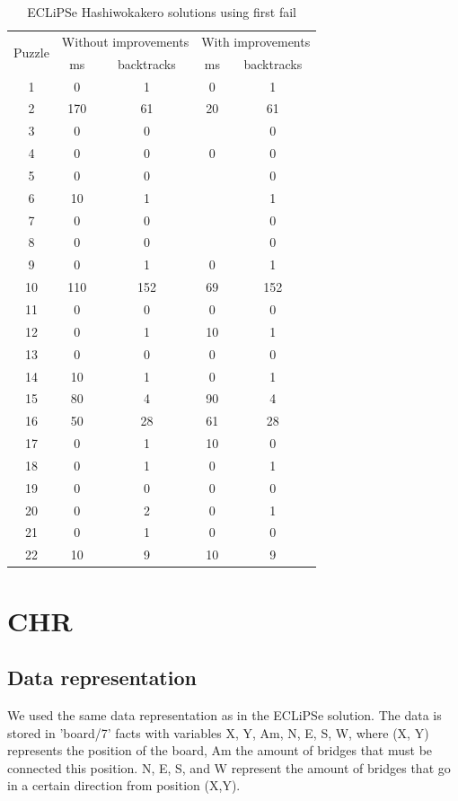 \documentclass{report}
\begin{document}
\begin{table}[h!]
  \begin{tabular}{|c|c|c|c|c|}
    \hline
    \multirow{2}{*}{Puzzle} &
    \multicolumn{2}{L|}{Without improvements} &
    \multicolumn{2}{L|}{With improvements}\\
    & ms & backtracks & ms & backtracks \\
    \hline
    1 & 0 & 1 & 0 & 1 \\
    2 & 170 & 61 & 20 & 61 \\
    3 & 0 & 0 &  & 0 \\
    4 & 0 & 0 & 0 & 0 \\
    5 & 0 & 0 &  & 0 \\
    6 & 10 & 1 &  & 1 \\
    7 & 0 & 0 &  & 0 \\
    8 & 0 & 0 &  & 0 \\
    9 & 0 & 1 & 0 & 1 \\
    10 & 110 & 152 & 69 & 152 \\
    11 & 0 & 0 & 0 & 0 \\
    12 & 0 & 1 & 10 & 1 \\
    13 & 0 & 0 & 0 & 0 \\
    14 & 10 & 1 & 0 & 1 \\
    15 & 80 & 4 & 90 & 4 \\
    16 & 50 & 28 & 61 & 28 \\
    17 & 0 & 1 & 10 & 0 \\
    18 & 0 & 1 & 0 & 1 \\
    19 & 0 & 0 & 0 & 0 \\
    20 & 0 & 2 & 0 & 1 \\
    21 & 0 & 1 & 0 & 0 \\
    22 & 10 & 9 & 10 & 9 \\
    \hline
  \end{tabular}
  \caption{ECLiPSe Hashiwokakero solutions using first fail}
\end{table}

\newpage
\section{CHR}
\subsection{Data representation}
We used the same data representation as in the ECLiPSe solution. The data is stored in 'board/7' facts with variables X, Y, Am, N, E, S, W, where (X, Y) represents the position of the board, Am the amount of bridges that must be connected this position. N, E, S, and W represent the amount of bridges that go in a certain direction from position (X,Y).
\end{document}
